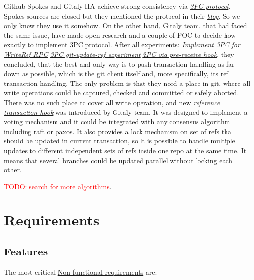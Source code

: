 \documentclass[acmlarge, screen, nonacm]{acmart}
\newcommand{\todo}[1]{\textcolor{red}{TODO: #1}}
\begin{document}
Github Spokes and Gitaly HA achieve strong consistency via \emph{\href{https://en.wikipedia.org/wiki/Three-phase_commit_protocol}{3PC protocol}}.
Spokes sources are closed but they mentioned the protocol in their \emph{\href{https://github.blog/2017-10-13-stretching-spokes/\#reducing-round-trips}{blog}}.
So we only know they use it somehow.
On the other hand, Gitaly team, that had faced the same issue, have made open research and a couple of POC to decide how exactly to implement 3PC protocol.
After all experiments:
\emph{\href{https://gitlab.com/gitlab-org/gitaly/-/issues/2466}{Implement 3PC for WriteRef RPC}}
\emph{\href{https://gitlab.com/gitlab-org/gitaly/-/issues/2529}{3PC git-update-ref experiment}}
\emph{\href{https://gitlab.com/gitlab-org/gitaly/-/issues/2635}{2PC via pre-receive hook}},
  they concluded, that the best and only way is to push transaction handling as far down as possible, which is the git client itself and, more specifically, its ref transaction handling.
The only problem is that they need a place in git, where all write operations could be captured, checked and committed or safely aborted.
There was no such place to cover all write operation, and new
\emph{\href{https://github.com/git/git/commit/675415976704459edaf8fb39a176be2be0f403d8}{reference transaction hook}}
was introduced by Gitaly team.
It was designed to implement a voting mechanism and it could be integrated with any consensus algorithm including raft or paxos.
It also provides a lock mechanism on set of refs tha should be updated in current transaction, so it is possible to handle multiple updates to different independent sets of refs inside one repo at the same time.
It means that several branches could be updated parallel without locking each other.

\todo{search for more algorithms}.



\section{Requirements}
\label{sec:requirements}

\subsection{Features}
\label{sec:features}

The most critical
\href{https://en.wikipedia.org/wiki/Non-functional_requirement}{Non-functional requirements}
are:
\end{document}
